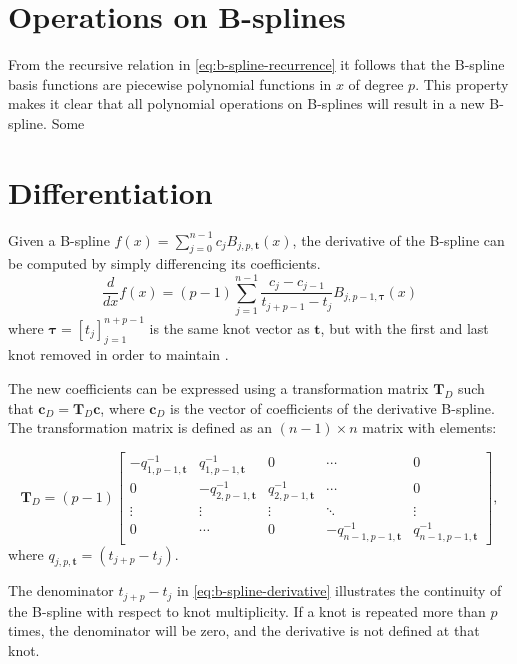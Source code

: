 \section{Operations on B-splines}
From the recursive relation in \cref{eq:b-spline-recurrence} it follows that the B-spline basis functions are piecewise polynomial functions in $x$ of degree $p$. This property makes it clear that all polynomial operations on B-splines will result in a new B-spline. Some 


\section{Differentiation}
Given a B-spline $f(x) = \sum_{j=0}^{n-1} c_j B_{j, p, \mathbf{t}}(x)$,
the derivative of the B-spline can be computed by simply differencing its coefficients. 
\begin{equation}\label{eq:b-spline-derivative}
    \frac{d}{dx} f(x) = (p-1) \sum_{j=1}^{n-1} \frac{c_j-c_{j-1}}{t_{j+p-1}-t_j} B_{j, p-1, \boldsymbol{\tau}}(x)
\end{equation}
where $\boldsymbol{\tau} = [t_j]_{j=1}^{n+p-1}$ is the same knot vector as $\mathbf{t}$, but with the first and last knot removed in order to maintain .

The new coefficients can be expressed using a transformation matrix $\mathbf T_D$ such that $\mathbf{c}_D = \mathbf T_D \mathbf{c}$, where $\mathbf{c}_D$ is the vector of coefficients of the derivative B-spline. The transformation matrix is defined as an $(n-1) \times n$ matrix with elements:

\begin{equation}
    \mathbf T_D = (p-1) \begin{bmatrix}
        -q_{1,p-1,\mathbf{t}}^{-1} & q_{1,p-1,\mathbf{t}}^{-1} & 0 & \cdots & 0 \\
        0 & -q_{2,p-1,\mathbf{t}}^{-1} & q_{2,p-1,\mathbf{t}}^{-1} & \cdots & 0 \\
        \vdots & \vdots & \vdots & \ddots & \vdots \\
        0 & \cdots & 0 & -q_{n-1,p-1,\mathbf{t}}^{-1} & q_{n-1,p-1,\mathbf{t}}^{-1} 
    \end{bmatrix},
\end{equation}
where $q_{j,p,\mathbf{t}} = (t_{j+p}-t_j)$.


The denominator $t_{j+p}-t_j$ in \cref{eq:b-spline-derivative} illustrates the continuity of the B-spline with respect to knot multiplicity. If a knot is repeated more than $p$ times, the denominator will be zero, and the derivative is not defined at that knot.

